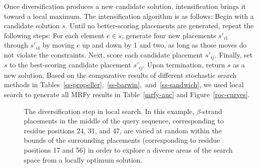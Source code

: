 \documentclass[blockstyle,times,preprint]{sigplanconf}
\begin{document}
Once diversification produces a new candidate solution, intensification brings
it toward a local maximum.
The intensification algorithm is as follows:
Begin with a candidate solution $s$.
Until no better-scoring placements are generated, repeat the following steps:
For each element $e \in s$, generate four new placements $s'_{i1}$ 
through $s'_{i4}$ by moving $e$ up and down by 1 and two, as long as those 
moves do not violate the constraints.
Next, score each candidate placement $s'_{ij}$.
Finally, set $s$ to the best-scoring candidate placement $s'_{ij}$.
Upon termination, return $s$ as a new solution.
Based on the comparative results of different stochastic search methods in 
Tables~\ref{ss-propeller},~\ref{ss-barwin},~and~\ref{ss-sandwich},
we used local search to generate all MRFy results in Table~\ref{mrfy-auc} 
and Figure~\ref{roc-curves}.


\begin{figure}[htb!]
\begin{center}
   \caption[The diversification step in local search.]
   {The diversification step in local search.
   In this example, $\beta$-strand placements in the middle of the query
   sequence, corresponding to residue positions 24, 31, and 47, are varied
   at random within the bounds of the surrounding placements (corresponding
   to residue positions 17 and 56) in order
   to explore a diverse areas of the search space from a locally optimum 
   solution.}
   \label{diversification}
 \end{center}
\end{figure}

% 
% 
% 
\end{document}
